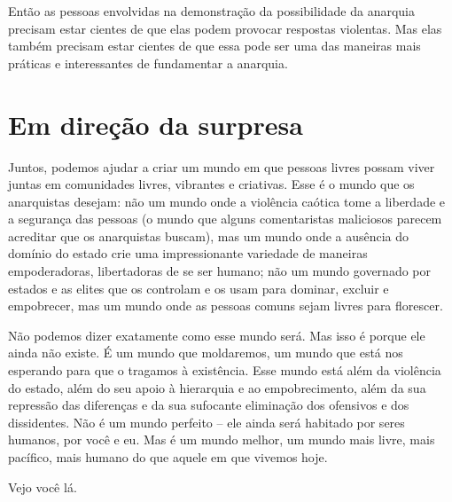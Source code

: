Então as pessoas envolvidas na demonstração da possibilidade da anarquia precisam estar cientes de que elas podem provocar respostas violentas. Mas elas também precisam estar cientes de que essa pode ser uma das maneiras mais práticas e interessantes de fundamentar a anarquia.

\section{Em direção da surpresa}

Juntos, podemos ajudar a criar um mundo em que pessoas livres possam viver juntas em comunidades livres, vibrantes e criativas. Esse é o mundo que os anarquistas desejam: não um mundo onde a violência caótica tome a liberdade e a segurança das pessoas (o mundo que alguns comentaristas maliciosos parecem acreditar que os anarquistas buscam), mas um mundo onde a ausência do domínio do estado crie uma impressionante variedade de maneiras empoderadoras, libertadoras de se ser humano; não um mundo governado por estados e as elites que os controlam e os usam para dominar, excluir e empobrecer, mas um mundo onde as pessoas comuns sejam livres para florescer.

Não podemos dizer exatamente como esse mundo será. Mas isso é porque ele ainda não existe. É um mundo que moldaremos, um mundo que está nos esperando para que o tragamos à existência. Esse mundo está além da violência do estado, além do seu apoio à hierarquia e ao empobrecimento, além da sua repressão das diferenças e da sua sufocante eliminação dos ofensivos e dos dissidentes. Não é um mundo perfeito -- ele ainda será habitado por seres humanos, por você e eu. Mas é um mundo melhor, um mundo mais livre, mais pacífico, mais humano do que aquele em que vivemos hoje.

Vejo você lá.